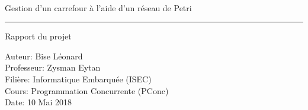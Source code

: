 \documentclass[11pt,a4paper]{memoir}
\begin{document}

\thispagestyle{empty}

\sffamily


\large

~\vspace{\fill}

\begin{center}
{\HUGE 
Gestion d'un carrefour à l'aide d'un réseau de Petri
}
\vspace{1cm}
\hrule
\vspace{1cm}
{\LARGE
Rapport du projet
}
\end{center}

\vspace{3.5cm}

\begin{flushleft}
Auteur: Bise Léonard\\
Professeur: Zysman Eytan\\
Filière: Informatique Embarquée (ISEC)\\
Cours: Programmation Concurrente (PConc)\\
Date: 10 Mai 2018
\end{flushleft}

\vspace{\fill}

\cleardoublepage


\tableofcontents

\clearpage


\listoffigures  %
\end{document}
